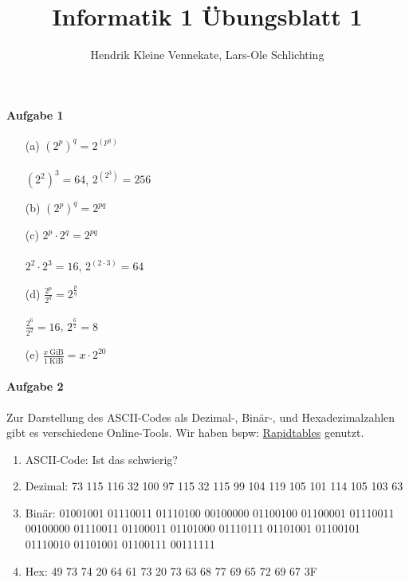 \documentclass[12pt, letterpaper]{article}
\title{Informatik 1 Übungsblatt 1}
\author{Hendrik Kleine Vennekate, Lars-Ole Schlichting}
\date{}
\newcommand{\checkmark}{\ding{51}} %
\newcommand{\xmark}{\ding{55}} %
\begin{document}
\maketitle

\paragraph{Aufgabe 1}

\begin{enumerate}
    \item[(a)] $(2^p)^q = 2^{(p^q)}$ \xmark\\ \\
        $(2^2)^3 = 64$, $2^{(2^3)} = 256$
    \item[(b)] $(2^p)^q = 2^{pq}$ \checkmark
    \item[(c)] $2^p \cdot 2^q = 2^{pq}$ \xmark\\ \\
        $2^2 \cdot 2^3 = 16$, $2^{(2 \cdot 3)} = 64$
    \item[(d)] $\frac{2^p}{2^q} = 2^{\frac{p}{q}}$ \xmark\\ \\
        $\frac{2^6}{2^2} = 16$, $2^{\frac{6}{2}} = 8$
    \item[(e)] $\frac{x \ \text{GiB}}{1 \ \text{KiB}} = x \cdot 2^{20}$ \checkmark
\end{enumerate}

\paragraph{Aufgabe 2}

\noindent Zur Darstellung des ASCII-Codes als Dezimal-, Binär-, und Hexadezimalzahlen gibt es verschiedene Online-Tools. Wir haben bspw: \href{https://www.rapidtables.com/convert/number/ascii-hex-bin-dec-converter.html}{Rapidtables} genutzt.

\begin{enumerate}
    \item ASCII-Code: Ist das schwierig?
    \item Dezimal: 73 115 116 32 100 97 115 32 115 99 104 119 105 101 114 105 103 63
    \item Binär: 01001001 01110011 01110100 00100000 01100100 01100001 01110011 00100000 01110011 01100011 01101000 01110111 01101001 01100101 01110010 01101001 01100111 00111111
    \item Hex: 49 73 74 20 64 61 73 20 73 63 68 77 69 65 72 69 67 3F
\end{enumerate}
\end{document}
